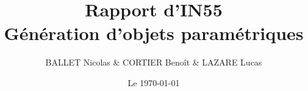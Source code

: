\documentclass[a4paper,12pt]{article}
\begin{document}
\title{Rapport d'IN55 \\ Génération d'objets paramétriques}
\author{BALLET Nicolas \& CORTIER Benoît \& LAZARE Lucas}
\date{Le \today}

\maketitle

\tableofcontents








\end{document}
